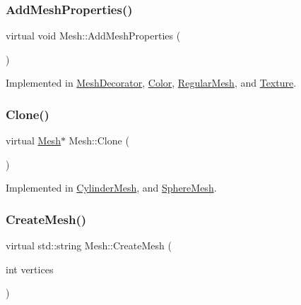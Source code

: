 \mbox{\label{class_mesh_a4369b541f608d9a812da80f4d7b13661}} 
\subsubsection{\texorpdfstring{AddMeshProperties()}{AddMeshProperties()}}
{\footnotesize\ttfamily virtual void Mesh\+::\+Add\+Mesh\+Properties (\begin{DoxyParamCaption}{ }\end{DoxyParamCaption})\hspace{0.3cm}{\ttfamily [pure virtual]}}



Implemented in \mbox{\hyperlink{class_mesh_decorator_a8afe0a2ff59d5c10e8b48b2307c05e53}{Mesh\+Decorator}}, \mbox{\hyperlink{class_color_abd3f6be3b5babb28bf1a13c89219bd4b}{Color}}, \mbox{\hyperlink{class_regular_mesh_a1f24f9c533797074ade33aee4e97cfb6}{Regular\+Mesh}}, and \mbox{\hyperlink{class_texture_aa7e2f179b2117c32e03e38fdc0f85290}{Texture}}.

\mbox{\label{class_mesh_a11928acab4066671d10e9e531ad96fb6}} 
\subsubsection{\texorpdfstring{Clone()}{Clone()}}
{\footnotesize\ttfamily virtual \mbox{\hyperlink{class_mesh}{Mesh}}$\ast$ Mesh\+::\+Clone (\begin{DoxyParamCaption}{ }\end{DoxyParamCaption})\hspace{0.3cm}{\ttfamily [pure virtual]}}



Implemented in \mbox{\hyperlink{class_cylinder_mesh_ad9e278dd523b06090b4e64f70a262575}{Cylinder\+Mesh}}, and \mbox{\hyperlink{class_sphere_mesh_a5dfa031b4cdd31a81154221c882a5dfa}{Sphere\+Mesh}}.

\mbox{\label{class_mesh_ae1d22f25fdcadd6dc58793462ffa65a6}} 
\subsubsection{\texorpdfstring{CreateMesh()}{CreateMesh()}}
{\footnotesize\ttfamily virtual std\+::string Mesh\+::\+Create\+Mesh (\begin{DoxyParamCaption}\item[{int}]{vertices }\end{DoxyParamCaption})\hspace{0.3cm}{\ttfamily [pure virtual]}}




